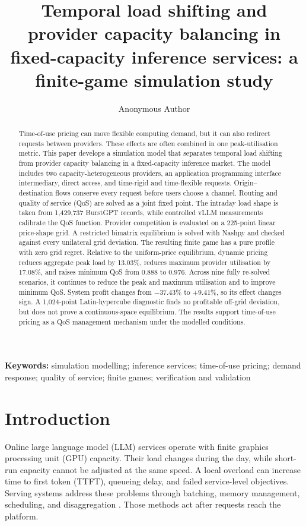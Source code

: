 \documentclass[11pt,a4paper]{article}
\title{\textbf{Temporal load shifting and provider capacity balancing in fixed-capacity inference services: a finite-game simulation study}}
\author{Anonymous Author}
\date{}
\begin{document}
\maketitle

\begin{abstract}
Time-of-use pricing can move flexible computing demand, but it can also redirect requests between providers. These effects are often combined in one peak-utilisation metric. This paper develops a simulation model that separates temporal load shifting from provider capacity balancing in a fixed-capacity inference market. The model includes two capacity-heterogeneous providers, an application programming interface intermediary, direct access, and time-rigid and time-flexible requests. Origin--destination flows conserve every request before users choose a channel. Routing and quality of service (QoS) are solved as a joint fixed point. The intraday load shape is taken from 1,429,737 BurstGPT records, while controlled vLLM measurements calibrate the QoS function. Provider competition is evaluated on a 225-point linear price-shape grid. A restricted bimatrix equilibrium is solved with Nashpy and checked against every unilateral grid deviation. The resulting finite game has a pure profile with zero grid regret. Relative to the uniform-price equilibrium, dynamic pricing reduces aggregate peak load by 13.03\%, reduces maximum provider utilisation by 17.08\%, and raises minimum QoS from 0.888 to 0.976. Across nine fully re-solved scenarios, it continues to reduce the peak and maximum utilisation and to improve minimum QoS. System profit changes from $-37.43\%$ to $+9.41\%$, so its effect changes sign. A 1,024-point Latin-hypercube diagnostic finds no profitable off-grid deviation, but does not prove a continuous-space equilibrium. The results support time-of-use pricing as a QoS management mechanism under the modelled conditions.
\end{abstract}

\noindent\textbf{Keywords:} simulation modelling; inference services; time-of-use pricing; demand response; quality of service; finite games; verification and validation

\section{Introduction}
\label{sec:introduction}

Online large language model (LLM) services operate with finite graphics processing unit (GPU) capacity. Their load changes during the day, while short-run capacity cannot be adjusted at the same speed. A local overload can increase time to first token (TTFT), queueing delay, and failed service-level objectives. Serving systems address these problems through batching, memory management, scheduling, and disaggregation \cite{yu2022orca,kwon2023pagedattention,agrawal2024sarathiserve,patel2024splitwise,zhong2024distserve}. Those methods act after requests reach the platform.
\end{document}
